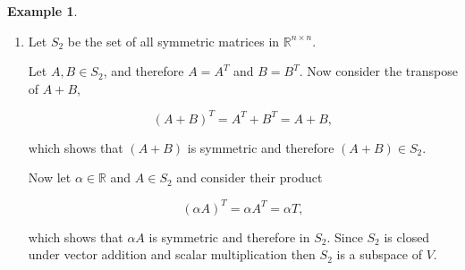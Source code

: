 \documentclass[12pt]{article}
\theoremstyle{definition}
\newtheorem*{example}{Example}
\begin{document}
\begin{example}
\begin{enumerate}[label = (\arabic*)]
\begin{enumerate}[label = (\roman*)]
\item Let $S_2$ be the set of all symmetric matrices in $\mathbb{R}^{n \times n}$.

Let $A, B \in S_2$, and therefore $A = A^T$ and $B = B^T$. Now consider the transpose
of $A + B$,

\[
(A + B)^T = A^T + B^T = A + B,
\]

which shows that $(A + B)$ is symmetric and therefore $(A + B) \in S_2$. 

Now let $\alpha \in \mathbb{R}$ and $A \in S_2$ and consider their product

\[ (\alpha A)^T = \alpha A^T = \alpha T, \] 

which shows that $\alpha A$ is
symmetric and therefore in $S_2$. Since $S_2$ is closed under vector addition
and scalar multiplication then $S_2$ is a subspace of $V$.

\end{enumerate}

\end{enumerate}

\end{example}
\end{document}
